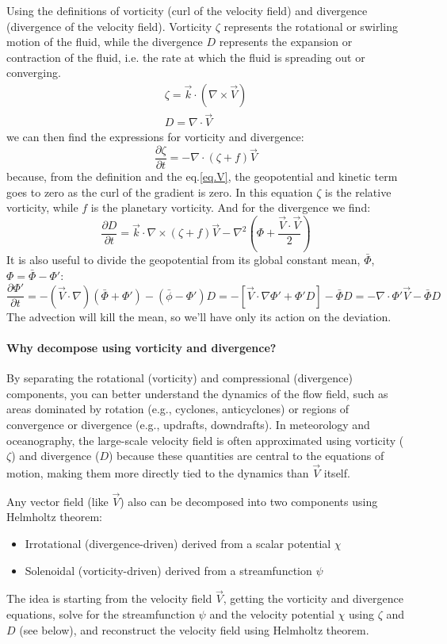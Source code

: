 Using the definitions of vorticity (curl of the velocity field) and divergence (divergence of the velocity field). Vorticity $\zeta$ represents the rotational or swirling motion of the fluid, while the divergence $D$ represents the expansion or contraction of the fluid, i.e. the rate at which the fluid is spreading out or converging.
\begin{align}
	\zeta=\vec{k}\cdot(\nabla\times \vec{V}) \\
	D=\nabla\cdot\vec{V}
\end{align}
we can then find the expressions for vorticity and divergence:
\begin{equation}\label{eq.for vorticity and divergence}
	\frac{\partial\zeta}{\partial t}=-\nabla\cdot(\zeta +f)\vec{V}
\end{equation}
because, from the definition and the eq.\ref{eq.V}, the geopotential and kinetic term goes to zero as the curl of the gradient is zero. In this equation $\zeta$ is the relative vorticity, while $f$ is the planetary vorticity. And for the divergence we find:
\begin{equation}
	\frac{\partial D}{\partial t}=\vec{k}\cdot\nabla\times(\zeta+f)\vec{V}-\nabla^2\left(\Phi+\frac{\vec{V}\cdot\vec{V}}{2}\right)
\end{equation}
It is also useful to divide the geopotential from its global constant mean, $\bar{\Phi}$, $\Phi=\bar{\Phi}-\Phi'$:
$$\frac{\partial\Phi'}{\partial t}=-(\vec{V}\cdot\nabla)(\bar{\Phi}+\Phi')-(\bar{\phi}-\Phi')D=-[\vec{V}\cdot\nabla\Phi'+\Phi'D]-\bar{\Phi}D=-\nabla\cdot\Phi'\vec{V}-\bar{\Phi}D$$
The advection will kill the mean, so we'll have only its action on the deviation.

\paragraph{Why decompose using vorticity and divergence?}
By separating the rotational (vorticity) and compressional (divergence) components, you can better understand the dynamics of the flow field, such as areas dominated by rotation (e.g., cyclones, anticyclones) or regions of convergence or divergence (e.g., updrafts, downdrafts).
In meteorology and oceanography, the large-scale velocity field is often approximated using vorticity ($\zeta$) and divergence ($D$) because these quantities are central to the equations of motion, making them more directly tied to the dynamics than $\vec{V}$ itself.


Any vector field (like $\vec{V}$) also can be decomposed into two components using Helmholtz theorem:
\begin{itemize}
	\item Irrotational (divergence-driven) derived from a scalar potential $\chi$
	\item Solenoidal (vorticity-driven) derived from a streamfunction $\psi$
\end{itemize}
The idea is starting from the velocity field $\vec{V}$, getting the vorticity and divergence equations, solve for the streamfunction $\psi$ and the velocity potential $\chi$ using $\zeta$ and $D$ (see below), and reconstruct the velocity field using Helmholtz theorem.
